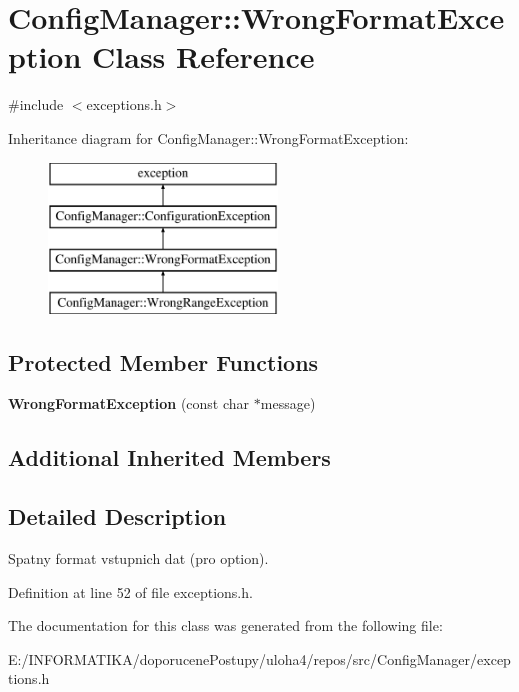 \hypertarget{class_config_manager_1_1_wrong_format_exception}{}\section{Config\+Manager\+:\+:Wrong\+Format\+Exception Class Reference}
\label{class_config_manager_1_1_wrong_format_exception}


{\ttfamily \#include $<$exceptions.\+h$>$}

Inheritance diagram for Config\+Manager\+:\+:Wrong\+Format\+Exception\+:\begin{figure}[H]
\begin{center}
\leavevmode
\includegraphics[height=4.000000cm]{class_config_manager_1_1_wrong_format_exception}
\end{center}
\end{figure}
\subsection*{Protected Member Functions}
\begin{DoxyCompactItemize}
\item 
{\bfseries Wrong\+Format\+Exception} (const char $\ast$message)\hypertarget{class_config_manager_1_1_wrong_format_exception_aa38389d999dd1c463fb887a36980b7ce}{}\label{class_config_manager_1_1_wrong_format_exception_aa38389d999dd1c463fb887a36980b7ce}

\end{DoxyCompactItemize}
\subsection*{Additional Inherited Members}


\subsection{Detailed Description}
Spatny format vstupnich dat (pro option). 

Definition at line 52 of file exceptions.\+h.



The documentation for this class was generated from the following file\+:\begin{DoxyCompactItemize}
\item 
E\+:/\+I\+N\+F\+O\+R\+M\+A\+T\+I\+K\+A/doporucene\+Postupy/uloha4/repos/src/\+Config\+Manager/exceptions.\+h\end{DoxyCompactItemize}
